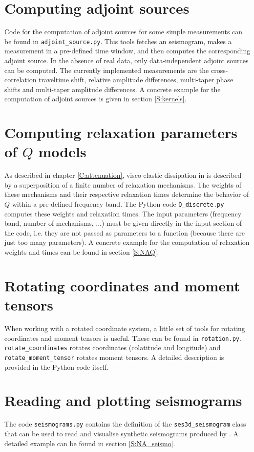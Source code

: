 \section{Computing adjoint sources}

Code for the computation of adjoint sources for some simple measurements can be found in \texttt{adjoint\_source.py}. This tools fetches an \SES seismogram, makes a measurement in a pre-defined time window, and then computes the corresponding adjoint source. In the absence of real data, only data-independent adjoint sources can be computed. The currently implemented measurements are the cross-correlation traveltime shift, relative amplitude differences, multi-taper phase shifts and multi-taper amplitude differences. A concrete example for the computation of adjoint sources is given in section \ref{S:kernels}.


\section{Computing relaxation parameters of $Q$ models}

As described in chapter \ref{C:attenuation}, visco-elastic dissipation in \SES is described by a superposition of a finite number of relaxation mechanisms. The weights of these mechanisms and their respective relaxation times determine the behavior of $Q$ within a pre-defined frequency band. The Python code \texttt{Q\_discrete.py} computes these weights and relaxation times. The input parameters (frequency band, number of mechanisms, ...) must be given directly in the input section of the code, i.e. they are not passed as parameters to a function (because there are just too many parameters). A concrete example for the computation of relaxation weights and times can be found in section \ref{S:NAQ}.

\section{Rotating coordinates and moment tensors}

When working with a rotated coordinate system, a little set of tools for rotating coordinates and moment tensors is useful. These can be found in \texttt{rotation.py}. \texttt{rotate\_coordinates} rotates coordinates (colatitude and longitude) and \texttt{rotate\_moment\_tensor} rotates moment tensors. A detailed description is provided in the Python code itself.

\section{Reading and plotting seismograms}

The code \texttt{seismograms.py} contains the definition of the \texttt{ses3d\_seismogram} class that can be used to read and visualise synthetic seismograms produced by \SES. A detailed example can be found in section \ref{S:NA_seismo}.
